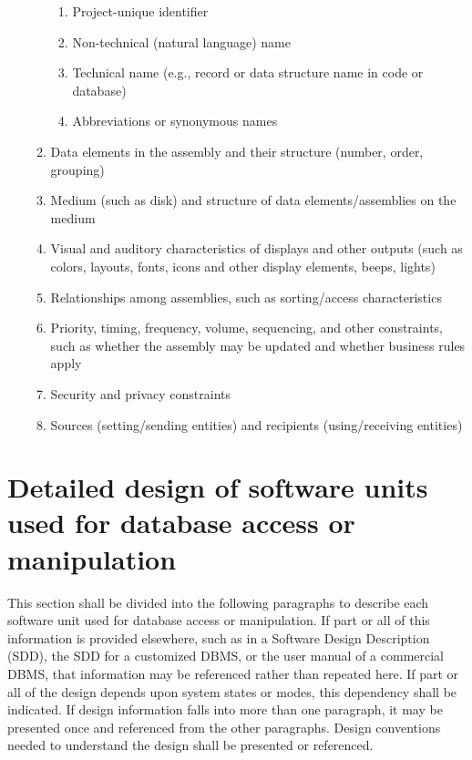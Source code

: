 \begin{enumerate}
\begin{enumerate}
    \begin{enumerate}
    \itemsep1pt\parskip0pt
    \item
      Project-unique identifier
    \item
      Non-technical (natural language) name
    \item
      Technical name (e.g., record or data structure name in code or
      database)
    \item
      Abbreviations or synonymous names
    \end{enumerate}
  \item
    Data elements in the assembly and their structure (number, order,
    grouping)
  \item
    Medium (such as disk) and structure of data elements/assemblies on
    the medium
  \item
    Visual and auditory characteristics of displays and other outputs
    (such as colors, layouts, fonts, icons and other display elements,
    beeps, lights)
  \item
    Relationships among assemblies, such as sorting/access
    characteristics
  \item
    Priority, timing, frequency, volume, sequencing, and other
    constraints, such as whether the assembly may be updated and whether
    business rules apply
  \item
    Security and privacy constraints
  \item
    Sources (setting/sending entities) and recipients (using/receiving
    entities)
  \end{enumerate}
\end{enumerate}

\section{Detailed design of software units used for database access
or manipulation}

This section shall be divided into the following paragraphs to describe
each software unit used for database access or manipulation. If part or
all of this information is provided elsewhere, such as in a Software
Design Description (SDD), the SDD for a customized DBMS, or the user
manual of a commercial DBMS, that information may be referenced rather
than repeated here. If part or all of the design depends upon system
states or modes, this dependency shall be indicated. If design
information falls into more than one paragraph, it may be presented once
and referenced from the other paragraphs. Design conventions needed to
understand the design shall be presented or referenced.

